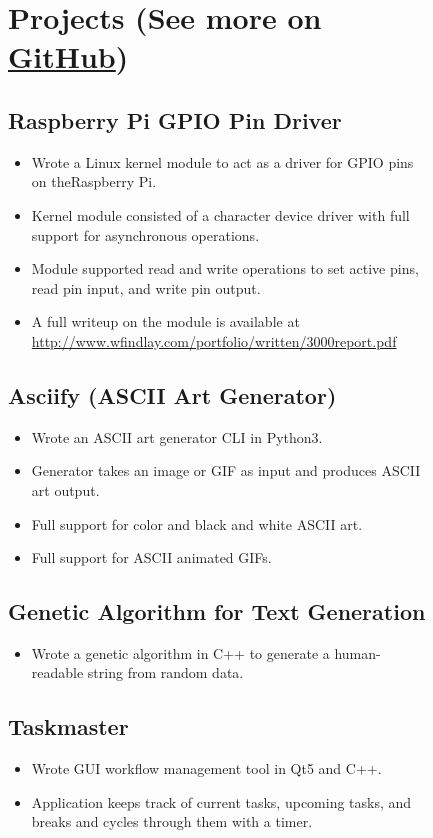 \documentclass[]{article}
\theoremstyle{plain}
\theoremstyle{remark}
\theoremstyle{definition}
\begin{document}
\begin{figure}
\begin{minipage}[t]{0.65\textwidth}
\section{Projects \normalfont \small (See more on \href{https://www.github.com/housedhorse}{\color{black}GitHub})}

\subsection{Raspberry Pi GPIO Pin Driver}
\begin{itemize}[itemsep=0em]
\item Wrote a Linux kernel module to act as a driver for GPIO pins on the\newline Raspberry Pi.
\item Kernel module consisted of a character device driver with full support for asynchronous operations.
\item Module supported read and write operations to set active pins, read pin input, and write pin output.
\item A full writeup on the module is available at \url{http://www.wfindlay.com/portfolio/written/3000report.pdf}
\end{itemize}

\subsection{Asciify (ASCII Art Generator)}
\begin{itemize}[itemsep=0em]
\item Wrote an ASCII art generator CLI in Python3.
\item Generator takes an image or GIF as input and produces ASCII art output.
\item Full support for color and black and white ASCII art.
\item Full support for ASCII animated GIFs.
\end{itemize}

\subsection{Genetic Algorithm for Text Generation}
\begin{itemize}[itemsep=0em]
\item Wrote a genetic algorithm in C++ to generate a human-readable string from random data.
\end{itemize}

\subsection{Taskmaster}
\begin{itemize}[itemsep=0em]
\item Wrote GUI workflow management tool in Qt5 and C++.
\item Application keeps track of current tasks, upcoming tasks, and breaks and cycles through them with a timer.
\end{itemize}


\end{minipage}
\end{figure}
\end{document}

